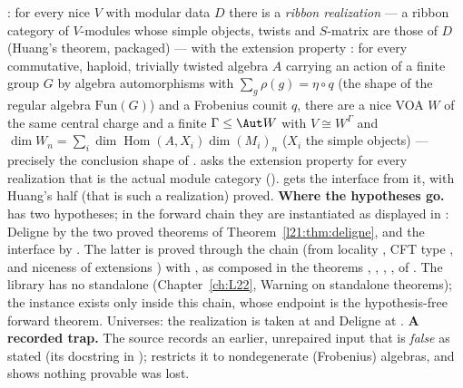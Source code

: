 \begin{dictionary}
: for every nice $V$ with modular data $D$ there is a \emph{ribbon realization}  ---
a ribbon category of $V$-modules whose simple objects, twists and $S$-matrix are those of $D$ (Huang's theorem, packaged)
--- with the extension property : for every commutative, haploid, trivially twisted
algebra $A$ carrying an action of a finite group $G$ by algebra automorphisms with $\sum_g\rho(g)=\eta\circ q$ (the
shape of the regular algebra $\mathrm{Fun}(G)$) and a Frobenius counit $q$, there are a nice VOA $W$ of the same central
charge and a finite $\Gamma\le\Aut W$ with $V\cong W^\Gamma$ and
$\dim W_n=\sum_i\dim\operatorname{Hom}(A,X_i)\dim(M_{i})_n$ ($X_i$ the simple objects) --- precisely the conclusion
shape of .  asks the extension
property for every realization that is the actual module category  ().
 gets the interface from it, with Huang's half (that  is such a
realization) proved. \textbf{Where the hypotheses go.}  has two  hypotheses; in the
forward chain they are instantiated as displayed in : Deligne by the two proved
theorems of Theorem~\ref{l21:thm:deligne}, and the interface by . The latter is proved through
the chain  (from locality , CFT type
, and niceness of extensions ) with
, as composed in the theorems , ,
, ,  of
. The library has no standalone 
(Chapter~\ref{ch:L22}, Warning on standalone theorems); the instance exists only inside this chain, whose endpoint is
the hypothesis-free forward theorem. Universes: the realization is taken at  and Deligne at
.
\textbf{A recorded trap.} The source records an earlier, unrepaired input  that is \emph{false} as
stated (its docstring in );  restricts it to nondegenerate (Frobenius)
algebras, and  shows nothing provable was lost.
\end{dictionary}

